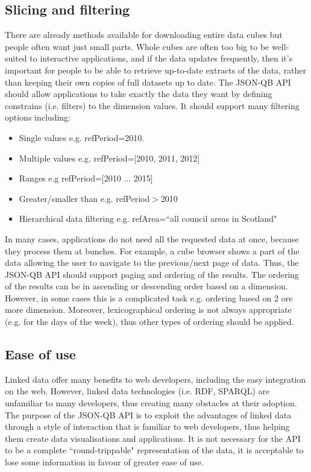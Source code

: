 \documentclass{llncs}
\begin{document}
\subsection{Slicing and filtering}\label{sec:slice}

There are already methods available for downloading entire data cubes but people often want just small parts.  Whole cubes are often too big to be well-suited to interactive applications, and if the data updates frequently,  then it's important for people to be able to retrieve up-to-date extracts of the data, rather than keeping their own copies of full datasets up to date. The JSON-QB API should allow applications to take exactly the data they want by defining constrains (i.e. filters) to the dimension values. It should support many filtering options including:
\begin{itemize}
\item Single values e.g. refPeriod=2010.
\item Multiple values e.g. refPeriod=[2010, 2011, 2012]
\item Ranges e.g refPeriod=[2010 ... 2015]
\item Greater/smaller than e.g. refPeriod$>$2010
\item Hierarchical data filtering e.g. refArea=``all council areas in Scotland"
\end{itemize}

In many cases, applications do not need all the requested data at once, because they process them at bunches. For example, a cube browser shows a part of the data allowing the user to navigate to the previous/next page of data. Thus, the JSON-QB API should support paging and ordering of the results. The ordering of the results can be in ascending or descending order based on a dimension. However, in some cases this is a complicated  task e.g.  ordering based on 2 ore more dimension. Moreover, lexicographical ordering is not always appropriate (e.g. for the days of the week), thus other types of ordering should be applied.

\subsection{Ease of use}

Linked data offer many benefits to web developers, including the easy integration on the web. However, linked data technologies (i.e. RDF, SPARQL) are unfamiliar to many developers, thus creating many obstacles at their adoption. The purpose of the JSON-QB API is to exploit the advantages of linked data through a style of interaction that is familiar to web developers, thus helping them create data visualisations and applications. It is not necessary for the API to be a complete ``round-trippable" representation of the data, it is acceptable to lose some information in favour of greater ease of use.
\end{document}
